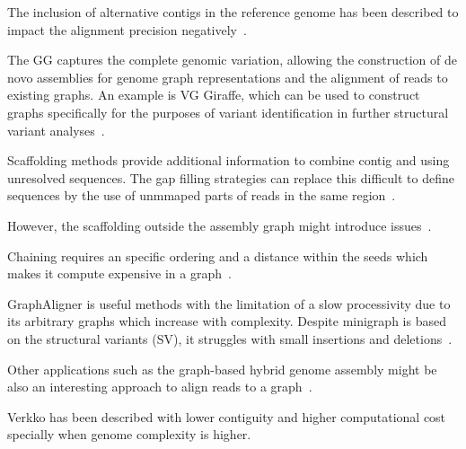 \documentclass[12pt, letterpaper]{article}
\begin{document}
The inclusion of alternative contigs in the reference genome has been described to impact the alignment precision negatively~\cite{Mahmoud2025}.


The GG captures the complete genomic variation, allowing the construction of de novo assemblies for genome graph representations and the alignment of reads to existing graphs. An example is VG Giraffe, which can be used to construct graphs specifically for the purposes of variant identification in further structural variant analyses~\cite{Mahmoud2025}.

Scaffolding methods provide additional information to combine contig and using unresolved sequences. The gap filling strategies can replace this difficult to define sequences by the use of unmmaped parts of reads in the same region~\cite{Mahmoud2025}.

However, the scaffolding outside the assembly graph might introduce issues~\cite{Mahmoud2025}.

Chaining requires an specific ordering and a distance within the seeds which makes it compute expensive in a graph~\cite{Chang2025}. 

GraphAligner is useful methods with the limitation of a slow processivity due to its arbitrary graphs which increase with complexity. Despite minigraph is based on the structural variants (SV), it struggles with small insertions and deletions~\cite{Chang2025}. 


Other applications such as the graph-based hybrid genome assembly might be also an interesting approach to align reads to a graph~\cite{Rautiainen2023}.

Verkko has been described with lower contiguity and higher computational cost specially when genome complexity is higher.
\end{document}
